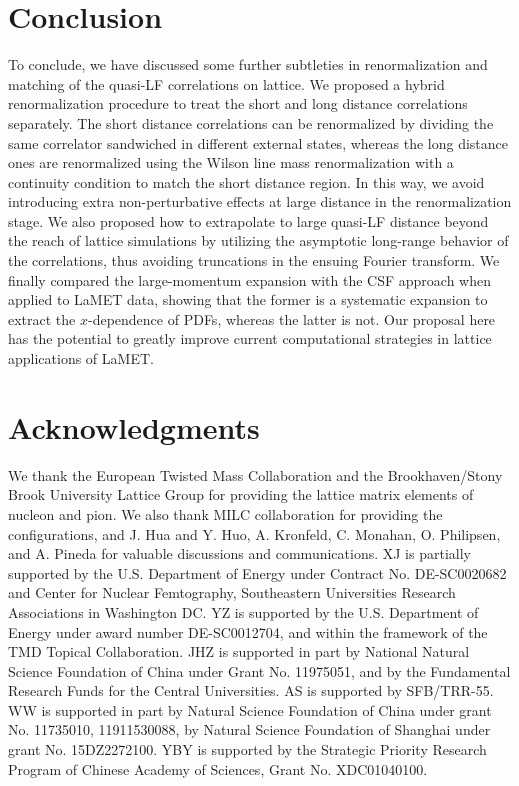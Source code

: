 \documentclass[preprint,12pt]{elsarticle}
\begin{document}
\section{Conclusion}
\label{sec:conclusion}

To conclude, we have discussed some further subtleties in renormalization
and matching of the quasi-LF correlations on lattice. We proposed a hybrid renormalization procedure to treat the short and long distance correlations separately. The short distance correlations can be renormalized by dividing the same correlator sandwiched in different external states, whereas the long distance ones are renormalized using the Wilson line mass renormalization with a continuity condition to match the short distance region. In this way, we avoid introducing extra non-perturbative effects at large distance in the renormalization stage. We also proposed how to extrapolate to large quasi-LF distance beyond the reach of lattice simulations by utilizing the asymptotic long-range behavior of the correlations, thus avoiding truncations in the ensuing Fourier transform. We finally compared the large-momentum expansion with the CSF approach when applied to LaMET data, showing that the former is a systematic expansion to extract the $x$-dependence of PDFs, whereas the latter is not.
Our proposal here has the potential to greatly improve current computational strategies in lattice applications of LaMET.


\section*{Acknowledgments}

We thank the European Twisted Mass Collaboration and the Brookhaven/Stony Brook University Lattice Group for providing the lattice matrix elements of nucleon and pion. We also thank MILC collaboration for providing the configurations, and J. Hua and Y. Huo, A. Kronfeld, C. Monahan, O. Philipsen, and A. Pineda for valuable discussions and communications. XJ is partially supported by the U.S. Department of Energy under Contract No. DE-SC0020682
and Center for Nuclear Femtography, Southeastern Universities Research Associations in Washington DC.
YZ is supported by the U.S. Department of Energy under award number DE-SC0012704, and within the framework of the TMD Topical Collaboration. JHZ is supported in part by National Natural Science Foundation of China under Grant No. 11975051, and by the Fundamental Research Funds for the Central Universities. AS is supported by SFB/TRR-55. WW is supported in part by Natural Science Foundation of China under grant No. 11735010, 11911530088, by Natural Science Foundation of Shanghai under grant No. 15DZ2272100. YBY is supported by the Strategic Priority Research Program of Chinese Academy of Sciences, Grant No. XDC01040100.
\end{document}
